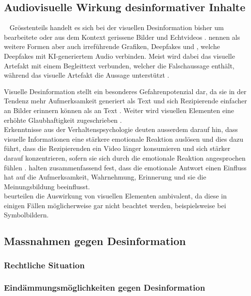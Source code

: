 \documentclass[12pt,a4paper]{article}        %
\begin{document}
\subsection{Audiovisuelle Wirkung desinformativer Inhalte}
~\label{theory_audiovisual_content}
Grösstenteils handelt es sich bei der visuellen Desinformation bisher um bearbeitete oder aus dem Kontext gerissene Bilder und Echtvideos \parencite[15]{bradshaw_industrialized_2021}. \textcite[3698]{weikmann_visual_2023} nennen als weitere Formen aber auch irreführende Grafiken, Deepfakes und , welche Deepfakes mit KI-generiertem Audio verbinden. Meist wird dabei das visuelle Artefakt mit einem Begleittext verbunden, welcher die Falschaussage enthält, während das visuelle Artefakt die Aussage unterstützt \parencite[3700]{weikmann_visual_2023}.

Visuelle Desinformation stellt ein besonderes Gefahrenpotenzial dar, da sie in der Tendenz mehr Aufmerksamkeit generiert als Text \parencites[3701]{weikmann_visual_2023} und sich Rezipierende einfacher an Bilder erinnern können als an Text \parencite{grady_neural_1998}. Weiter wird visuellen Elementen eine erhöhte Glaubhaftigkeit zugeschrieben \parencite[3703f]{weikmann_visual_2023}.\\ Erkenntnisse aus der Verhaltenspsychologie deuten ausserdem darauf hin, dass visuelle Informationen eine stärkere emotionale Reaktion auslösen \parencite[3703]{weikmann_visual_2023} und dies dazu führt, dass die Rezipierenden ein Video länger konsumieren und sich stärker darauf konzentrieren, sofern sie sich durch die emotionale Reaktion angesprochen fühlen \parencite[146]{teixeira_emotion-induced_2012}. \textcite[23]{zhou_effects_2005} halten zusammenfassend fest, dass die emotionale Antwort einen Einfluss hat auf die Aufmerksamkeit, Wahrnehmung, Erinnerung und sie die Meinungsbildung beeinflusst. \\
\textcite[501]{schaewitz_when_2020} beurteilen die Auswirkung von visuellen Elementen ambivalent, da diese in einigen Fällen möglicherweise gar nicht beachtet werden, beispielsweise bei Symbolbildern.

\subsection{Massnahmen gegen Desinformation}
\subsubsection{Rechtliche Situation}
\subsubsection{Eindämmungsmöglichkeiten gegen Desinformation}
\end{document}
